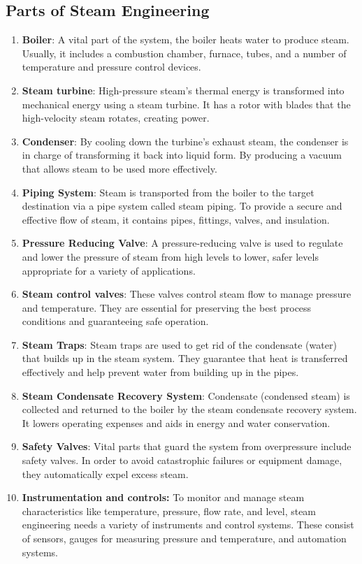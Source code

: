\subsection{Parts of Steam Engineering}
\begin{enumerate}
    \item \textbf{Boiler}: A vital part of the system, the boiler heats water to produce steam. Usually, it includes a combustion chamber, furnace, tubes, and a number of temperature and pressure control devices. 
    \item \textbf{Steam turbine}: High-pressure steam's thermal energy is transformed into mechanical energy using a steam turbine. It has a rotor with blades that the high-velocity steam rotates, creating power. 
    \item \textbf{Condenser}: By cooling down the turbine's exhaust steam, the condenser is in charge of transforming it back into liquid form. By producing a vacuum that allows steam to be used more effectively. 
    \item \textbf{Piping System}: Steam is transported from the boiler to the target destination via a pipe system called steam piping. To provide a secure and effective flow of steam, it contains pipes, fittings, valves, and insulation. 
    \item \textbf{Pressure Reducing Valve}: A pressure-reducing valve is used to regulate and lower the pressure of steam from high levels to lower, safer levels appropriate for a variety of applications. 
    \item \textbf{Steam control valves}: These valves control steam flow to manage pressure and temperature. They are essential for preserving the best process conditions and guaranteeing safe operation. 
    \item \textbf{Steam Traps}: Steam traps are used to get rid of the condensate (water) that builds up in the steam system. They guarantee that heat is transferred effectively and help prevent water from building up in the pipes. 
    \item \textbf{Steam Condensate Recovery System}: Condensate (condensed steam) is collected and returned to the boiler by the steam condensate recovery system. It lowers operating expenses and aids in energy and water conservation. 
    \item \textbf{Safety Valves}: Vital parts that guard the system from overpressure include safety valves. In order to avoid catastrophic failures or equipment damage, they automatically expel excess steam.
    \item \textbf{Instrumentation and controls:} To monitor and manage steam characteristics like temperature, pressure, flow rate, and level, steam engineering needs a variety of instruments and control systems. These consist of sensors, gauges for measuring pressure and temperature, and automation systems. 
\end{enumerate} 


